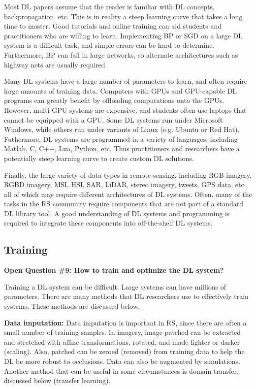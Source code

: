 \documentclass[12pt]{spieman}
\begin{document}
\begin{spacing}{1}
Most DL papers assume that the reader is familiar with DL concepts, backpropagation, etc. This is in reality a steep learning curve that takes a long time to master. Good tutorials and online training can aid students and practitioners who are willing to learn. Implementing BP or SGD on a large DL system is a difficult task, and simple errors can be hard to determine. Furthermore, BP can fail in large networks, so alternate architectures such as highway nets are usually required.

Many DL systems have a large number of parameters to learn, and often require large amounts of training data. Computers with GPUs and GPU-capable DL programs can greatly benefit by offloading computations onto the GPUs. However, multi-GPU systems are expensive, and students often use laptops that cannot be equipped with a GPU. Some DL systems run under Microsoft Windows, while others run under variants of Linux (e.g. Ubuntu or Red Hat). Futhermore, DL systems are programmed in a variety of languages, including Matlab, C, C++, Lua, Python, etc. Thus practitioners and researchers have a potentially steep learning curve to create custom DL solutions.

Finally, the large variety of data types in remote sensing, including RGB imagery, RGBD imagery, MSI, HSI, SAR, LiDAR, stereo imagery, tweets, GPS data, etc., all of which may require different architectures of DL systems. Often, many of the tasks in the RS community require components that are not part of a standard DL library tool. A good understanding of DL systems and programming is required to integrate these components into off-the-shelf DL systems.

%
%

\subsection{Training}
\label{subsec:ChallengesOpportunities_ix} 
\textbf{Open Question \#9: How to train and optimize the DL system?} 

Training a DL system can be difficult. Large systems can have millions of parameters. There are many methods that DL researchers use to effectively train systems. These methods are discussed below.

\textbf{Data imputation:} Data imputation \cite{hinton2006fast} is important in RS, since there are often a small number of training samples. In imagery, image patched can be extracted and stretched with affine transformations, rotated, and made lighter or darker (scaling). Also, patched can be zeroed (removed) from training data to help the DL be more robust to occlusions. Data can also be augmented by simulations. Another method that can be useful in some circumstances is domain transfer, discussed below (transfer learning).
    

\end{spacing}
\end{document}
